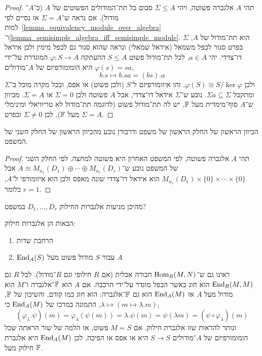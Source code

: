 \begin{proof}
	תהי $A$ אלגברה פשוטה, ויהי $\Sigma \le A$ סכום כל תת־המודולים הפשוטים של $A$ (כ־$A$־מודול).
	אם נראה ש־$\Sigma = A$ אז נסיים לפי למות\ \ref{lemma_equivalency_module_over_algebra} ו־\ref{lemma_semisimple_algebra_iff_semisimple_module}.
	$\Sigma$ הוא תת־מודול של $A$, בפרט סגור לכפל משמאל (אידאל שמאלי) ונראה שהוא סגור גם לכפל מימין ולכן אידאל דו־צדדי.
	יהי $a \in A$, לכל תת־מודול פשוט $S \le A$ ההעתקה $\varphi : S \to A$ המוגדרת על־ידי $\varphi(s) = s a$ היא הומומורפיזם של $A$־מודולים,
	\[
		b . s
		\mapsto b . s a
		= (b s) . a
	\]
	ולכן $\varphi(S) \cong S / \ker \varphi$, זהו איזומורפיזם ל־$S$ (ולכן פשוט) או אפס, ובכל מקרה מוכל ב־$\Sigma$ ומתקבל $\Sigma a \subseteq \Sigma$.
	נובע ש־$\Sigma$ אידאל דו־צדדי, אבל $A$ פשוטה ולכן $\Sigma = 0$ או $\Sigma = A$.
	מכיוון ש־$A$ סוף־מימדית מעל $\mathbb{F}$, יש לה תת־מודול פשוט (לדוגמה תת־מודול לא טריוויאלי ומינימלי מעל $\mathbb{F}$), לכן $\Sigma \ne 0$ ובפרט $\Sigma = A$.
\end{proof}
\begin{proposition}
	הכיוון הראשון של החלק הראשון של משפט ודרבורן נובע מהכיוון הראשון של החלק השני של המשפט.
\end{proposition}
\begin{proof}
	תהי $A$ אלגברה פשוטה, לפי המשפט האחרון היא פשוטה למחצה.
	לפי החלק השני של המשפט נובע ש־$A \cong M_{n_1}(D_1) \oplus \cdots \oplus M_{n_r}(D_r)$ אבל $M_{n_1}(D_1) \times \{ 0 \} \times \cdots \times \{ 0 \}$ הוא אידאל דו־צדדי שונה מאפס ולכן הוא איזומורפי ל־$A$, כלומר $r = 1$.
\end{proof}
מהיכן מגיעות אלגברות החילוק $D_1, \ldots, D_r$ במשפט?
\begin{example}
	הבאות הן אלגברות חילוק:
	\begin{enumerate}
		\item הרחבת שדות
		\item $\operatorname{End}_A(S)$ עבור $S$ מודול פשוט מעל $A$
	\end{enumerate}
\end{example}
ראינו גם ש־$\operatorname{Hom}_R(M, N)$ חבורה אבלית (אם $R$ חילופי וגם $R$־מודול).
לכל $R$ גם $\operatorname{End}_R(M, M)$ הוא חוג כאשר הכפל מוגדר על־ידי הרכבה.
אם $A$ הוא $\mathbb{F}$־אלגברה ו־$M$ הוא מודול מעל $A$ אז $\operatorname{End}_A(M)$ הוא גם $\mathbb{F}$־אלגברה:
הוא חוג כמו קודם, והשיכון של $\mathbb{F}$, $\lambda \mapsto (m \mapsto \lambda . m)$, התמונה במרכז של $\operatorname{End}_A(M)$ כי,
\[
	(\varphi_{\lambda} . \psi)(m)
	= \varphi_{\lambda}(\psi(m))
	= \lambda . \psi(m)
	= \psi(\lambda m)
	= (\psi \circ \varphi_{\lambda})(m)
\]
ונותר להראות שזו אלגברת חילוק.
אם $M = S$ פשוט, אז הלמה של שור הראתה שכל הומומורפיזם של $A$־מודולים $S \to S$ היא או אפס או הפיכה, לכן $\operatorname{End}_A(M)$ היא אלגברת חילוק מעל $\mathbb{F}$.

\listoftheorems[title=הגדרות ומשפטים,ignoreall,show={theorem,definition},swapnumber,onlynamed={proposition}]

